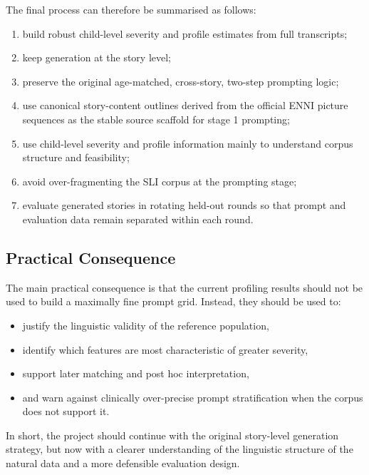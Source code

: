 The final process can therefore be summarised as follows:

\begin{enumerate}
    \item build robust child-level severity and profile estimates from full transcripts;
    \item keep generation at the story level;
    \item preserve the original age-matched, cross-story, two-step prompting logic;
    \item use canonical story-content outlines derived from the official ENNI picture sequences as the stable source scaffold for stage 1 prompting;
    \item use child-level severity and profile information mainly to understand corpus structure and feasibility;
    \item avoid over-fragmenting the SLI corpus at the prompting stage;
    \item evaluate generated stories in rotating held-out rounds so that prompt and evaluation data remain separated within each round.
\end{enumerate}

\subsection{Practical Consequence}

The main practical consequence is that the current profiling results should not be used to build a maximally fine prompt grid. Instead, they should be used to:

\begin{itemize}
    \item justify the linguistic validity of the reference population,
    \item identify which features are most characteristic of greater severity,
    \item support later matching and post hoc interpretation,
    \item and warn against clinically over-precise prompt stratification when the corpus does not support it.
\end{itemize}

In short, the project should continue with the original story-level generation strategy, but now with a clearer understanding of the linguistic structure of the natural data and a more defensible evaluation design.
